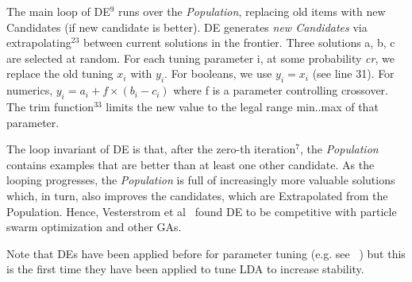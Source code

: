 \documentclass[twocolumn,5p,sort&compress]{elsarticle}
\theoremstyle{break}
\begin{document}
The main loop of DE$^{9}$ runs over the \textit{Population}, replacing old items with new Candidates (if new candidate is better).
DE generates \textit{new Candidates} via 
extrapolating$^{23}$ between current solutions in the frontier. Three solutions a, b, c\textit{} are
selected at random. For each tuning parameter i, at some probability \textit{cr}, we
replace the old tuning $x_i$ with $y_i$. For booleans, we use $y_i = x_i$ (see
line 31). For numerics, $y_i = a_i + f \times (b_i - c_i)$ where f is a
parameter controlling crossover. The trim function$^{33}$ limits the new value
to the legal range min..max of that parameter.

The loop invariant of DE is that, after the zero-th iteration$^7$, the \textit{Population}
contains examples that are better than at least one other candidate.
As the looping progresses, the \textit{Population} is full of increasingly more valuable solutions
which, in turn, also improves the candidates, which are Extrapolated from the Population.
Hence, Vesterstrom et al~\cite{vesterstrom2004comparative} found DE to be
competitive with particle swarm optimization and other GAs.

Note that DEs have been
applied before for parameter tuning (e.g. see~\cite{panichella2013effectively, lohar2013improving, sun2015msr4sm,omran2005differential,chiha2012tuning, fu2016tuning} ) but this is the first time they have been
applied to tune LDA to increase stability.
\end{document}
